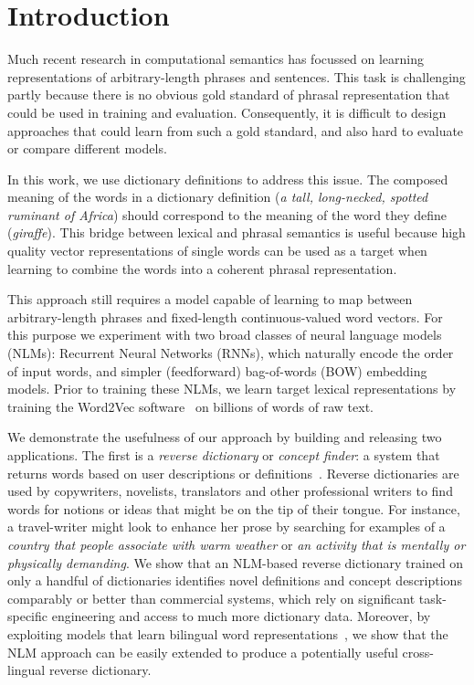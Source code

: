 
\section{Introduction}

Much recent research in computational semantics has focussed on learning representations of arbitrary-length phrases and sentences. This task is challenging partly because there is no obvious gold standard of phrasal representation that could be used in training and evaluation. Consequently, it is difficult to design approaches that could learn from such a gold standard, and also hard to evaluate or compare different models.

In this work, we use dictionary definitions to address this issue. The composed meaning of the words in a dictionary definition (\emph{a tall, long-necked, spotted ruminant of Africa}) should correspond to the meaning of the word they define (\emph{giraffe}). This bridge between lexical and phrasal semantics is useful because high quality vector representations of single words can be used as a target when learning to combine the words into a coherent phrasal representation.
 
This approach still requires a model capable of learning to map between arbitrary-length phrases and fixed-length continuous-valued word vectors. For this purpose we experiment with two broad classes of neural language models (NLMs): Recurrent Neural Networks (RNNs), which naturally encode the order of input words, and simpler (feedforward) bag-of-words (BOW) embedding models. Prior to training these NLMs, we learn target lexical representations by training the Word2Vec software~\cite{mikolov2013distributed} on billions of words of raw text. 

We demonstrate the usefulness of our approach by building and releasing two applications. The first is a \emph{reverse dictionary} or \emph{concept finder}: a system that returns words based on user descriptions or definitions~\cite{zock2004word}. Reverse dictionaries are used by copywriters, novelists, translators and other professional writers to find words for notions or ideas that might be on the tip of their tongue. For instance, a travel-writer might look to enhance her prose by searching for examples of a \emph{country that people associate with warm weather} or \emph{an activity that is mentally or physically demanding}. We show that an NLM-based reverse dictionary trained on only a handful of dictionaries identifies novel definitions and concept descriptions comparably or better than commercial systems, which rely on significant task-specific engineering and access to much more dictionary data. Moreover, by exploiting models that learn bilingual word representations~\cite{307754,Klementiev,hermann2013multilingual,gouws2014bilbowa}, we show that the NLM approach can be easily extended to produce a potentially useful cross-lingual reverse dictionary.

